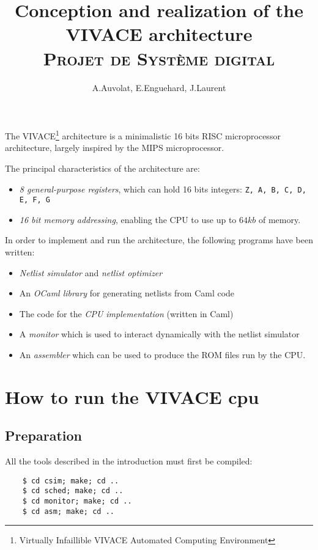 \documentclass[11pt, a4paper]{article}
\newcommand{\prog}[1]{{\tt#1}}
\begin{document}
\title{Conception and realization of the VIVACE architecture
             \\ \normalsize{\textsc{Projet de Système digital}}}
\author{A.Auvolat, E.Enguehard, J.Laurent}
\maketitle


The VIVACE\footnote{Virtually Infaillible VIVACE Automated Computing Environment} architecture is
a minimalistic 16 bits RISC microprocessor architecture, largely inspired by the MIPS
microprocessor.


The principal characteristics of the architecture are:

\begin{itemize}
\item \textit{8 general-purpose registers}, which can hold 16 bits integers: \prog{Z, A, B, C, D, E, F, G}
\item \textit{16 bit memory addressing}, enabling the CPU to use up to $64kb$ of memory.
\end{itemize}

In order to implement and run the architecture, the following programs have been written:

\begin{itemize}
\item \textit{Netlist  simulator} and \textit{netlist optimizer}
\item An \textit{OCaml library} for generating netlists from Caml code
\item The code for the \textit{CPU implementation} (written in Caml)
\item A \textit{monitor} which is used to interact dynamically with the netlist simulator
\item An \textit{assembler} which can be used to produce the ROM files run by the CPU.
\end{itemize}

\section{How to run the VIVACE cpu}
\subsection{Preparation}

All the tools described in the introduction must first be compiled:

\begin{verbatim}
    $ cd csim; make; cd .. 
    $ cd sched; make; cd .. 
    $ cd monitor; make; cd ..
    $ cd asm; make; cd ..
\end{verbatim}
\end{document}
